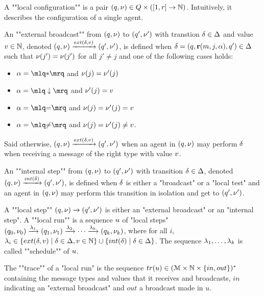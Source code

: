 \begin{definition}			
	A ""local configuration"" is a pair $(q, \nu) \in Q \times ([1,r] \to \mathbb{N})$. Intuitively, it describes the configuration of a single agent. 

	An ""external broadcast"" from $(q,\nu)$ to $(q',\nu')$ with transtion $\delta \in \Delta$ and value $v \in \mathbb{N}$, denoted $(q,\localdata) \extbr{\atrans}{\aval} (q',\localdata')$, is defined when $\delta = (q,\textbf{r}(m, j, \alpha),q') \in \Delta$
	such that $\nu(j') = \nu(j')$ for all $j' \neq j$ and one of the following cases holds:
		\begin{itemize}
			\item $\anact = \quotemarks{\dummyact}$ 
			and $\nu(j) = \nu'(j)$
			\item $\anact = \quotemarks{\enregact}$ and $\nu'(j) = v$
			\item $\anact = \quotemarks{\eqtestact}$ and $\nu(j) = \nu'(j)= v$
			\item $\anact = \quotemarks{\diseqtestact}$ and $\nu(j) = \nu'(j) \ne v$.
		\end{itemize}
	Said otherwise, $(q,\localdata) \extbr{\atrans}{\aval} (q',\localdata')$ when an agent in $(q,\nu)$ may perform $\delta$ when receiving a message of the right type with value $v$.

	An ""internal step"" from $(q,\nu)$ to $(q',\nu')$ with transition $\delta \in \Delta$, denoted $(q,\localdata) \intstep{\atrans} (q',\localdata')$, is defined when $\delta$ is either a "broadcast" or a "local test" and an agent in $(q,\nu)$ may perform this transition in isolation and get to $(q',\nu')$. 

	A ""local step"" $(q,\nu) \xrightarrow{} (q',\nu')$ is either an "external broadcast" or an "internal step". 
	A ""local run"" is a sequence $u$ of "local steps" $(q_0, \nu_0) \xrightarrow{\lambda_1} (q_1, \nu_1) \xrightarrow{\lambda_2} \cdots \xrightarrow{\lambda_k} (q_k, \nu_k)$, where for all $i$, $\locallabel_i \in \set{\extlabel{\atrans}{\aval} \mid \atrans \in \transitions, \aval \in \nats} \cup \set{\intlabel{\atrans} \mid \atrans \in \transitions}$. The sequence $\lambda_1, \dots, \lambda_k$ is called ""schedule"" of $u$.

	The ""trace"" of a "local run" is the sequence $\trace{\localrun} \in (\messages \times \nats \times \set{in, out})^*$ containing the message types and values that it receives and broadcasts, $in$ indicating an "external broadcast" and $out$ a broadcast made in $u$.


\end{definition}
